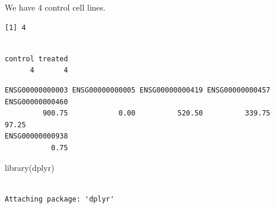 \documentclass[
  letterpaper,
  DIV=11,
  numbers=noendperiod]{scrartcl}
\newenvironment{Shaded}{\begin{snugshade}}{\end{snugshade}}
\newcommand{\DecValTok}[1]{\textcolor[rgb]{0.68,0.00,0.00}{#1}}
\newcommand{\FunctionTok}[1]{\textcolor[rgb]{0.28,0.35,0.67}{#1}}
\newcommand{\NormalTok}[1]{\textcolor[rgb]{0.00,0.23,0.31}{#1}}
\newcommand{\OtherTok}[1]{\textcolor[rgb]{0.00,0.23,0.31}{#1}}
\newcommand{\SpecialCharTok}[1]{\textcolor[rgb]{0.37,0.37,0.37}{#1}}
\newcommand{\StringTok}[1]{\textcolor[rgb]{0.13,0.47,0.30}{#1}}
\begin{document}
We have 4 control cell lines.

\begin{Shaded}
\end{Shaded}

\begin{verbatim}
[1] 4
\end{verbatim}

\begin{Shaded}
\end{Shaded}

\begin{verbatim}

control treated 
      4       4 
\end{verbatim}

\begin{Shaded}
\end{Shaded}

\begin{verbatim}
ENSG00000000003 ENSG00000000005 ENSG00000000419 ENSG00000000457 ENSG00000000460 
         900.75            0.00          520.50          339.75           97.25 
ENSG00000000938 
           0.75 
\end{verbatim}

\begin{Shaded}
\begin{Highlighting}[]
\FunctionTok{library}\NormalTok{(dplyr)}
\end{Highlighting}
\end{Shaded}

\begin{verbatim}

Attaching package: 'dplyr'
\end{verbatim}
\end{document}
